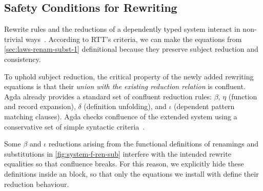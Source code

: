 \documentclass[manuscript,screen,review,anonymous,acmsmall]{acmart}
\begin{document}
\subsection{Safety Conditions for Rewriting}
\label{sec:safety}

Rewrite rules and the reductions of a dependently typed
system interact in non-trivial
ways~\cite{cockx:LIPIcs.TYPES.2019.2,leray_et_al:LIPIcs.ITP.2024.26,10.1145/3776704}.
According to RTT's criteria, we can make the equations from \cref{sec:laws-renam-subst-1}
definitional because they preserve subject reduction and consistency. 

To uphold subject reduction, the critical property of the newly added rewriting
equations is that their \emph{union with the existing reduction
  relation} is confluent. Agda already provides a standard set of confluent 
reduction rules: $\beta$, $\eta$ (function and record expansion),
$\delta$ (definition unfolding), and $\iota$ (dependent pattern matching clauses).  
Agda checks confluence of the extended system using a
conservative set of simple syntactic criteria~\cite{10.1145/3434341}.


Some $\beta$ and $\iota$ reductions arising from the functional
definitions of renamings and substitutions in \cref{fig:system-f-ren-sub}
interfere with the intended rewrite equalities so that confluence breaks. For this reason, we
explicitly hide these definitions inside an  block,
so that only the equations we install with  define
their reduction behaviour.
\end{document}
